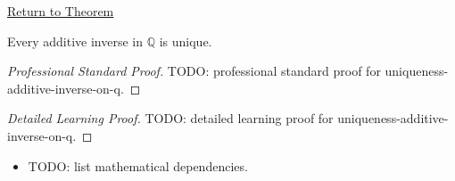 \newpage
{}
\label{prf:uniqueness-additive-inverse-on-q}

\begin{remark*}[Return]
\hyperref[cor:uniqueness-additive-inverse-on-q]{Return to Theorem}
\end{remark*}

\begin{corollary*}
Every additive inverse in $\mathbb{Q}$ is unique.
\end{corollary*}

\begin{proof}[Professional Standard Proof]
\LRAProofBodyStart
TODO: professional standard proof for uniqueness-additive-inverse-on-q.
\end{proof}

\begin{proof}[Detailed Learning Proof]
\LRAProofBodyStart
TODO: detailed learning proof for uniqueness-additive-inverse-on-q.
\end{proof}

\begin{remark*}
\end{remark*}

\begin{dependencies}
\begin{itemize}
  \item TODO: list mathematical dependencies.
\end{itemize}
\end{dependencies}

\clearpage
